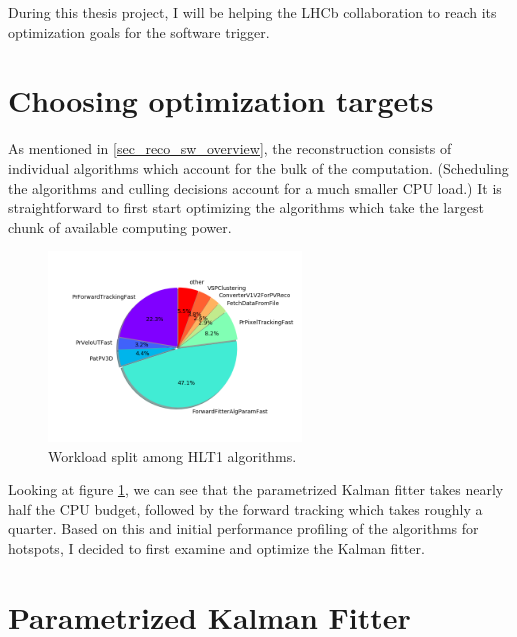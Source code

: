 \documentclass[12pt]{article}
\begin{document}
During this thesis project, I will be helping the LHCb collaboration to reach its optimization goals for the software trigger.


\newpage
\section{Choosing optimization targets}

As mentioned in \ref{sec_reco_sw_overview}, the reconstruction consists of individual algorithms which account for the bulk of the computation. (Scheduling the algorithms and culling decisions account for a much smaller CPU load.) It is straightforward to first start optimizing the algorithms which take the largest chunk of available computing power.

\begin{figure}[H]
	\begin{center}
		\includegraphics[width=0.6\textwidth]{algo_usage_original_bestphys}
	\end{center}
	\caption{Workload split among HLT1 algorithms.}
	\label{fig_algo_usage_choice}
\end{figure}

Looking at figure \ref{fig_algo_usage_choice}, we can see that the parametrized Kalman fitter takes nearly half the CPU budget, followed by the forward tracking which takes roughly a quarter. Based on this and initial performance profiling of the algorithms for hotspots, I decided to first examine and optimize the Kalman fitter. 


\newpage
\section{Parametrized Kalman Fitter}
\end{document}
